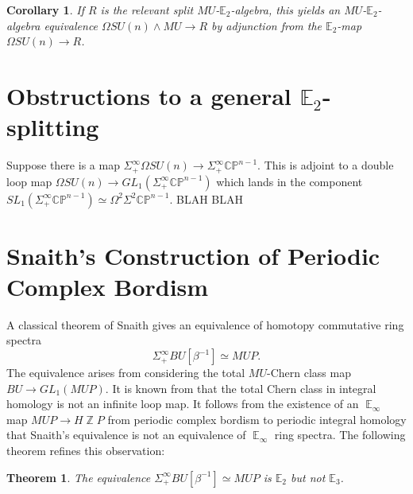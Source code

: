 \documentclass[oneside]{amsart}
\theoremstyle{definition}
\theoremstyle{plain}
\newtheorem{thm}[nul]{Theorem}
\newtheorem{cor}{Corollary}[nul]
\DeclareMathOperator{\smsh}{\wedge}
\DeclareMathOperator{\Z}{\mathbb{Z}}
\DeclareMathOperator{\E}{\mathbb{E}}
\begin{document}
\begin{cor}
If $R$ is the relevant split $MU$-$\mathbb{E}_2$-algebra, this yields an $MU$-$\mathbb{E}_2$-algebra equivalence $\Omega SU(n) \smsh MU \rightarrow R$ by adjunction from the $\mathbb{E}_2$-map $\Omega SU(n) \rightarrow R$.
\end{cor}

\section{Obstructions to a general \texorpdfstring{$\mathbb{E}_2$}{E2}-splitting}

Suppose there is a map $\Sigma^{\infty}_+ \Omega SU(n) \rightarrow \Sigma^{\infty}_+ \mathbb{CP}^{n-1}$.  This is adjoint to a double loop map $\Omega SU(n) \rightarrow GL_1(\Sigma^{\infty}_+\mathbb{CP}^{n-1})$ which lands in the component $SL_1(\Sigma^{\infty}_+ \mathbb{CP}^{n-1}) \simeq \Omega^2 \Sigma^2 \mathbb{CP}^{n-1}$.  BLAH BLAH

\section{Snaith's Construction of Periodic Complex Bordism} \label{sec:SnaithSplitting}

A classical theorem of Snaith \cite{SnaithOriginal} gives an equivalence of homotopy commutative ring spectra $$\Sigma^{\infty}_+ BU [\beta^{-1}] \simeq MUP.$$  The equivalence arises from considering the total $MU$-Chern class map $BU \to GL_1(MUP).$  It is known from \cite{SnaithNotMultiplicative} that the total Chern class in integral homology is not an infinite loop map.  It follows from the existence of an $\E_\infty$ map $MUP \to H\Z P$ from periodic complex bordism to periodic integral homology that Snaith's equivalence is not an equivalence of $\E_\infty$ ring spectra.  The following theorem refines this observation:



\begin{thm}
The equivalence $\Sigma^{\infty}_+ BU [\beta^{-1}] \simeq MUP$ is $\mathbb{E}_2$ but not $\mathbb{E}_3$.
\end{thm}
\end{document}
